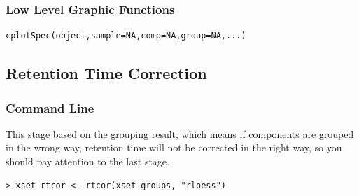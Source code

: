 \documentclass[11pt,a4paper]{article}
\begin{document}
\subsubsection*{Low Level Graphic Functions}
\begin{verbatim}
cplotSpec(object,sample=NA,comp=NA,group=NA,...)
\end{verbatim}

\newpage
\subsection{Retention Time Correction}
\subsubsection*{Command Line}
This stage based on the grouping result, which means if components are
grouped in the wrong way, retention time will not be corrected in the
right way, so you should pay attention to the last stage.
\begin{verbatim}
> xset_rtcor <- rtcor(xset_groups, "rloess")
\end{verbatim}
\end{document}
